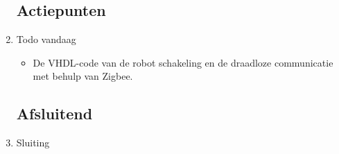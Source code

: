 \documentclass{article}
\begin{document}
\begin{enumerate}
\subsection*{Actiepunten}
\item Todo vandaag
\begin{itemize}
\item De VHDL-code van de robot schakeling en de draadloze communicatie met behulp van Zigbee. 
\end{itemize}

\noindent 
\subsection*{Afsluitend}
\item Sluiting

\end{enumerate}
\end{document}
